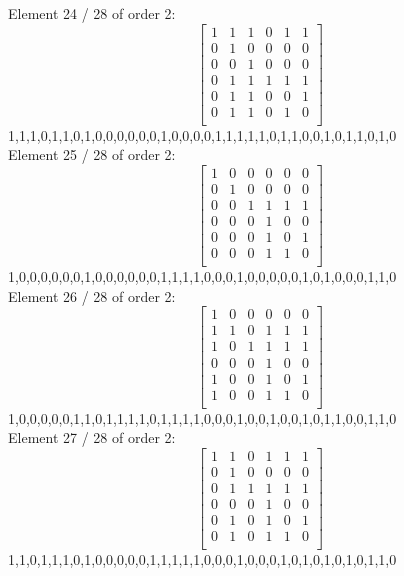 Element    24 / 28 of order 2:
$$
\left[
\begin{array}{*{6}{r}}
1 & 1 & 1 & 0 & 1 & 1\\
0 & 1 & 0 & 0 & 0 & 0\\
0 & 0 & 1 & 0 & 0 & 0\\
0 & 1 & 1 & 1 & 1 & 1\\
0 & 1 & 1 & 0 & 0 & 1\\
0 & 1 & 1 & 0 & 1 & 0\\
\end{array}
\right]
$$
1,1,1,0,1,1,0,1,0,0,0,0,0,0,1,0,0,0,0,1,1,1,1,1,0,1,1,0,0,1,0,1,1,0,1,0\\
Element    25 / 28 of order 2:
$$
\left[
\begin{array}{*{6}{r}}
1 & 0 & 0 & 0 & 0 & 0\\
0 & 1 & 0 & 0 & 0 & 0\\
0 & 0 & 1 & 1 & 1 & 1\\
0 & 0 & 0 & 1 & 0 & 0\\
0 & 0 & 0 & 1 & 0 & 1\\
0 & 0 & 0 & 1 & 1 & 0\\
\end{array}
\right]
$$
1,0,0,0,0,0,0,1,0,0,0,0,0,0,1,1,1,1,0,0,0,1,0,0,0,0,0,1,0,1,0,0,0,1,1,0\\
Element    26 / 28 of order 2:
$$
\left[
\begin{array}{*{6}{r}}
1 & 0 & 0 & 0 & 0 & 0\\
1 & 1 & 0 & 1 & 1 & 1\\
1 & 0 & 1 & 1 & 1 & 1\\
0 & 0 & 0 & 1 & 0 & 0\\
1 & 0 & 0 & 1 & 0 & 1\\
1 & 0 & 0 & 1 & 1 & 0\\
\end{array}
\right]
$$
1,0,0,0,0,0,1,1,0,1,1,1,1,0,1,1,1,1,0,0,0,1,0,0,1,0,0,1,0,1,1,0,0,1,1,0\\
Element    27 / 28 of order 2:
$$
\left[
\begin{array}{*{6}{r}}
1 & 1 & 0 & 1 & 1 & 1\\
0 & 1 & 0 & 0 & 0 & 0\\
0 & 1 & 1 & 1 & 1 & 1\\
0 & 0 & 0 & 1 & 0 & 0\\
0 & 1 & 0 & 1 & 0 & 1\\
0 & 1 & 0 & 1 & 1 & 0\\
\end{array}
\right]
$$
1,1,0,1,1,1,0,1,0,0,0,0,0,1,1,1,1,1,0,0,0,1,0,0,0,1,0,1,0,1,0,1,0,1,1,0\\
